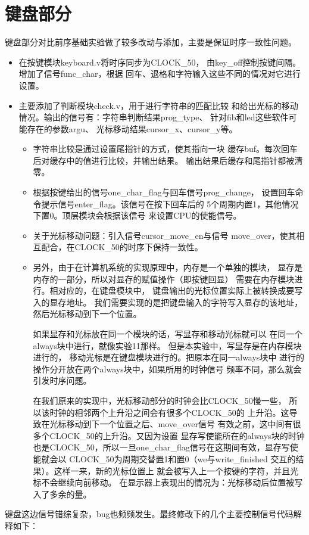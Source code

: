 \documentclass[12pt,a4paper,UTF8]{article}
\begin{document}
\section{键盘部分}
键盘部分对比前序基础实验做了较多改动与添加，主要是保证时序一致性问题。
\begin{itemize}
  \item 在按键模块\mbox{keyboard.v}将时序同步为CLOCK\_50，
        由key\_off控制按键间隔。增加了信号func\_char，根据
        回车、退格和字符输入这些不同的情况对它进行设置。
  \item 主要添加了判断模块\mbox{check.v}，用于进行字符串的匹配比较
        和给出光标的移动情况。输出的信号有：字符串判断结果prog\_type、
        针对fib和led这些软件可能存在的参数argu、
        光标移动结果cursor\_x、cursor\_y等。
        \begin{itemize}
          \item 字符串比较是通过设置尾指针的方式，使其指向一块
                缓存buf。每次回车后对缓存中的值进行比较，并输出结果。
                输出结果后缓存和尾指针都被清零。
          \item 根据按键给出的信号one\_char\_flag与回车信号prog\_change，
                设置回车命令提示信号enter\_flag。该信号在按下回车后的
                5个周期内置1，其他情况下置0。顶层模块会根据该信号
                来设置CPU的使能信号。
          \item 关于光标移动问题：引入信号cursor\_move\_en与信号
                move\_over，使其相互配合，在CLOCK\_50的时序下保持一致性。
          \item 另外，由于在计算机系统的实现原理中，内存是一个单独的模块，
                显存是内存的一部分，所以对显存的赋值操作（即按键回显）
                需要在内存模块进行。相对应的，在键盘模块中，
                键盘输出的光标位置实际上被转换成要写入的显存地址。
                我们需要实现的是把键盘输入的字符写入显存的该地址，
                然后光标移动到下一个位置。

                如果显存和光标放在同一个模块的话，写显存和移动光标就可以
                在同一个always块中进行，就像实验11那样。
                但是本实验中，写显存是在内存模块进行的，
                移动光标是在键盘模块进行的。把原本在同一always块中
                进行的操作分开放在两个always块中，如果所用的时钟信号
                频率不同，那么就会引发时序问题。

                在我们原来的实现中，光标移动部分的时钟会比CLOCK\_50慢一些，
                所以该时钟的相邻两个上升沿之间会有很多个CLOCK\_50的
                上升沿。这导致在光标移动到下一个位置之后、move\_over信号
                有效之前，这中间有很多个CLOCK\_50的上升沿。又因为设置
                显存写使能所在的always块的时钟也是CLOCK\_50，所以一旦\linebreak[4]
                one\_char\_flag信号在这期间有效，显存写使能就会以
                CLOCK\_50为周期交替置1和置0（we与write\_finished
                交互的结果）。这样一来，新的光标位置上
                就会被写入上一个按键的字符，并且光标不会继续向前移动。
                在显示器上表现出的情况为：光标移动后位置被写入了多余的量。
        \end{itemize}
\end{itemize}
键盘这边信号错综复杂，bug也频频发生。最终修改下的几个主要控制信号代码解释如下：
\end{document}
